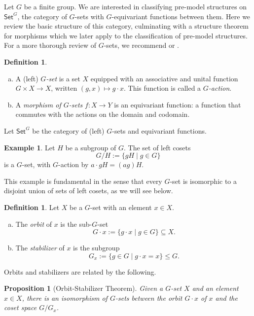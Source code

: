 \documentclass{amsart}
\newcommand{\Set}{\mathsf{Set}}
\newcommand{\GSet}{\Set^G}
\numberwithin{equation}{section}
\newtheorem{proposition}[equation]{Proposition}
\theoremstyle{definition}
\newtheorem{definition}[equation]{Definition}
\newtheorem{example}[equation]{Example}
\begin{document}
Let $G$ be a finite group. We are interested in classifying pre-model structures on $\GSet$, the category of $G$-sets with $G$-equivariant functions between them. Here we review the basic structure of this category, culminating with a structure theorem for morphisms which we later apply to the classification of pre-model structures. For a more thorough review of $G$-sets, we recommend \cite[Chapter 4]{dummitfoote} or \cite[Chapter 1]{tD1979}.

\begin{definition}\
	\begin{enumerate}[(a)]
		\item A (left) \emph{$G$-set} is a set $X$ equipped with an associative and unital function $G \times X \to X$, written $(g, x) \mapsto g \cdot x$. This function is called a \emph{$G$-action}.
		\item A \emph{morphism of $G$-sets} $f \colon X \to Y$ is an equivariant function: a function that commutes with the actions on the domain and codomain.
	\end{enumerate}
	Let $\GSet$ be the category of (left) $G$-sets and equivariant functions.
\end{definition}



\begin{example}
	Let $H$ be a subgroup of $G$. The set of left cosets
	\[
		G/H := \{gH \mid g \in G\}
	\]
	is a $G$-set, with $G$-action by $a \cdot gH = (ag)H$.
\end{example}

This example is fundamental in the sense that every $G$-set is isomorphic to a disjoint union of sets of left cosets, as we will see below.

\begin{definition}
	Let $X$ be a $G$-set with an element $x\in X$.
	\begin{enumerate}[(a)]
		\item The \emph{orbit} of $x$ is the sub-$G$-set
		      \[
			      G \cdot x := \{g \cdot x \mid g \in G\} \subseteq X.
		      \]
		\item The \emph{stabilizer} of $x$ is the subgroup
		      \[
			      G_x := \{g \in G \mid g \cdot x = x\} \leq G.
		      \]
	\end{enumerate}
\end{definition}

Orbits and stabilizers are related by the following.

\begin{proposition}[Orbit-Stabilizer Theorem]
	Given a $G$-set $X$ and an element $x \in X$, there is an isomorphism of $G$-sets between the orbit $G \cdot x$ of $x$ and the coset space $G/G_x$.
\end{proposition}
\end{document}
